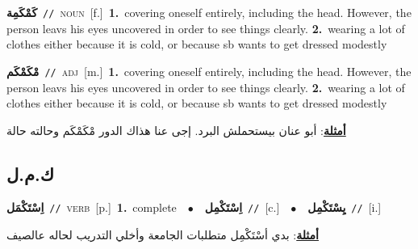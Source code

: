 \documentclass[10pt,a4paper,twoside]{article} %
\begin{document}
\begin{multicols}{2}
{\setlength\topsep{0pt}\textbf{\foreignlanguage{arabic}{كَمْكَمِة}}\ {\color{gray}\texttt{//}\color{black}}\ \textsc{noun}\ [f.]\ \textbf{1.}~covering oneself entirely, including the head. However, the person leavs his eyes uncovered in order to see things clearly.  \textbf{2.}~wearing a lot of clothes either because it is cold, or because sb wants to get dressed modestly\ } \vspace{2mm}

{\setlength\topsep{0pt}\textbf{\foreignlanguage{arabic}{مْكَمْكَم}}\ {\color{gray}\texttt{//}\color{black}}\ \textsc{adj}\ [m.]\ \textbf{1.}~covering oneself entirely, including the head. However, the person leavs his eyes uncovered in order to see things clearly.  \textbf{2.}~wearing a lot of clothes either because it is cold, or because sb wants to get dressed modestly\  \begin{flushright}\color{gray}\foreignlanguage{arabic}{\textbf{\underline{\foreignlanguage{arabic}{أمثلة}}}: أبو عنان بيستحملش البرد. إجى عنا هذاك الدور مْكَمْكَم وحالته حالة}\end{flushright}\color{black}} \vspace{2mm}

\vspace{-3mm}
\subsection*{\color{blue}\foreignlanguage{arabic}{ك.م.ل}\color{blue}{}} 

{\setlength\topsep{0pt}\textbf{\foreignlanguage{arabic}{اِسْتَكْمَل}}\ {\color{gray}\texttt{//}\color{black}}\ \textsc{verb}\ [p.]\ \textbf{1.}~complete\ \ $\bullet$\ \ \setlength\topsep{0pt}\textbf{\foreignlanguage{arabic}{اِسْتَكْمِل}}\ {\color{gray}\texttt{//}\color{black}}\ [c.]\ \ $\bullet$\ \ \setlength\topsep{0pt}\textbf{\foreignlanguage{arabic}{يِسْتَكْمِل}}\ {\color{gray}\texttt{//}\color{black}}\ [i.]\  \begin{flushright}\color{gray}\foreignlanguage{arabic}{\textbf{\underline{\foreignlanguage{arabic}{أمثلة}}}: بدي أسْتَكْمِل متطلبات الجامعة وأخلي التدريب لحاله عالصيف}\end{flushright}\color{black}} \vspace{2mm}


\end{multicols}
\end{document}
